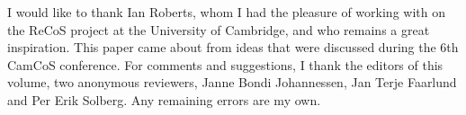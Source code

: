 \documentclass[output=paper]{langsci/langscibook}
\begin{document}
I would like to thank Ian Roberts, whom I had the pleasure of working with on
the ReCoS project at the University of Cambridge, and who remains a great
inspiration. This paper came about from ideas that were discussed during the
6th CamCoS conference. For comments and suggestions, I thank the editors of
this volume, two anonymous reviewers, Janne Bondi Johannessen, Jan Terje
Faarlund and Per Erik Solberg.  Any remaining errors are my own.

\printchapterglossary{}

{\sloppy
\printbibliography[heading=subbibliography,notkeyword=this]
}
\end{document}
